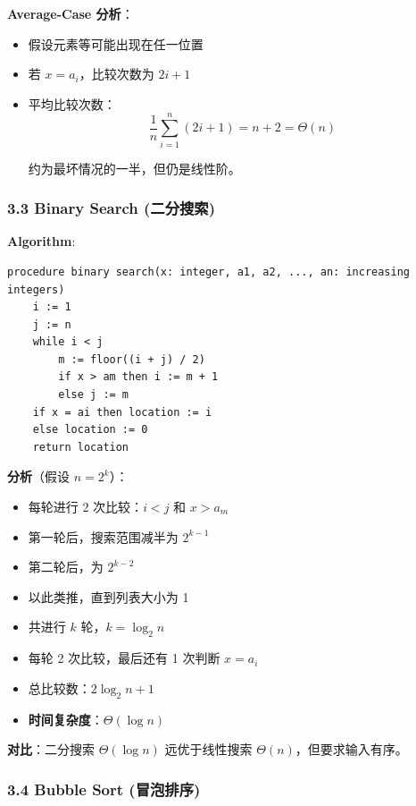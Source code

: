 \documentclass[10pt,a4paper,openany]{ctexbook}
\theoremstyle{definition}
\theoremstyle{remark}
\renewenvironment{quote}
  {\list{}{\leftmargin=1em\rightmargin=0pt\topsep=0.5pt\partopsep=0pt}\item[]}
  {\endlist}
\begin{document}
\textbf{Average-Case 分析}：
\begin{itemize}
\item 假设元素等可能出现在任一位置
\item 若 $x = a_i$，比较次数为 $2i + 1$
\item 平均比较次数：
\[
\frac{1}{n}\sum_{i=1}^{n}(2i+1) = n + 2 = \Theta(n)
\]

约为最坏情况的一半，但仍是线性阶。


\end{itemize}

\subsubsection{3.3 Binary Search (二分搜索)}

\textbf{Algorithm}:
{\footnotesize\begin{verbatim}
procedure binary search(x: integer, a1, a2, ..., an: increasing integers)
    i := 1
    j := n
    while i < j
        m := floor((i + j) / 2)
        if x > am then i := m + 1
        else j := m
    if x = ai then location := i
    else location := 0
    return location
\end{verbatim}}

\textbf{分析}（假设 $n = 2^k$）：
\begin{itemize}
\item 每轮进行 2 次比较：$i < j$ 和 $x > a_m$
\item 第一轮后，搜索范围减半为 $2^{k-1}$
\item 第二轮后，为 $2^{k-2}$
\item 以此类推，直到列表大小为 1
\item 共进行 $k$ 轮，$k = \log_2 n$
\item 每轮 2 次比较，最后还有 1 次判断 $x = a_i$
\item 总比较数：$2 \log_2 n + 1$
\item \textbf{时间复杂度}：$\Theta(\log n)$

\end{itemize}

\begin{quote}
\textbf{对比}：二分搜索 $\Theta(\log n)$ 远优于线性搜索 $\Theta(n)$，但要求输入有序。

\end{quote}

\subsubsection{3.4 Bubble Sort (冒泡排序)}
\end{document}
